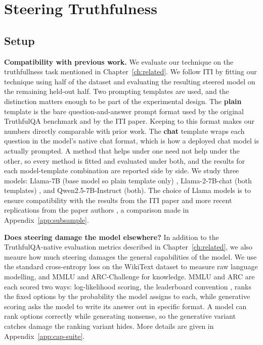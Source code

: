 \documentclass[logo,msc,notimes]{infthesis}
\begin{document}
\chapter{Steering Truthfulness}\label{ch:tqa}

\section{Setup}\label{sec:tqa-setup}

\textbf{Compatibility with previous work.} We evaluate our technique on the truthfullness task mentioned in Chapter~\ref{ch:related}. We follow ITI \citep{li2023iti} by fitting our technique using half of the dataset and evaluating the resulting steered model on the remaining held-out half. Two prompting templates are used, and the distinction matters enough to be part of the experimental design. The \textbf{plain} template
is the bare question-and-answer prompt format used by the original TruthfulQA benchmark and by the
ITI paper. Keeping to this format makes our numbers directly
comparable with prior work. The \textbf{chat} template wraps each question
in the model's native chat format, which is how a deployed chat model is actually prompted. A method
that helps under one need not help under the other, so every method is fitted and evaluated under
both, and the results for each model-template combination are reported side by side. We study three models: Llama-7B (base model so plain template only) \citep{touvron2023llama}, Llama-2-7B-chat (both templates) \citep{touvron2023llama2}, and Qwen2.5-7B-Instruct \citep{qwen2025qwen25} (both). The choice of Llama models is to ensure compatibility with the results from the ITI paper and more recent replications from the paper authors \citep{honestllama2023}, a comparison made in Appendix~\ref{app:subsample}.

\textbf{Does steering damage the model elsewhere?} In addition to the TruthfulQA-native evaluation metrics described in Chapter~\ref{ch:related}, we also meaure how much steering damages the general capabilities of the model. We use the standard cross-entropy loss on the WikiText \citep{merity2017wikitext} dataset to measure raw language modelling, and MMLU
\citep{hendrycks2021mmlu} and ARC-Challenge \citep{clark2018arc} for knowledge. MMLU and ARC are each
scored two ways: log-likelihood scoring, the leaderboard convention \citep{gao2024lmeval}, ranks the
fixed options by the probability the model assigns to each, while generative scoring asks the model to write its answer out in specific format. A model can rank options correctly while generating nonsense, so the generative variant catches damage the ranking variant hides. More details are given in Appendix~\ref{app:cap-suite}.
\end{document}
